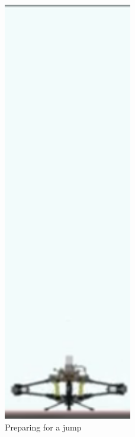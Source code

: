 \begin{figure}[H]
\begin{minipage}[b]{0.2\textwidth}
        \includegraphics[width=0.5\textwidth]{daedalus-jumper-2.png}
        \caption*{Preparing for a jump}
    \end{minipage}
    \hspace{0.02\textwidth}
    \begin{minipage}[b]{0.2\textwidth}
        \centering

\end{minipage}
\end{figure}
